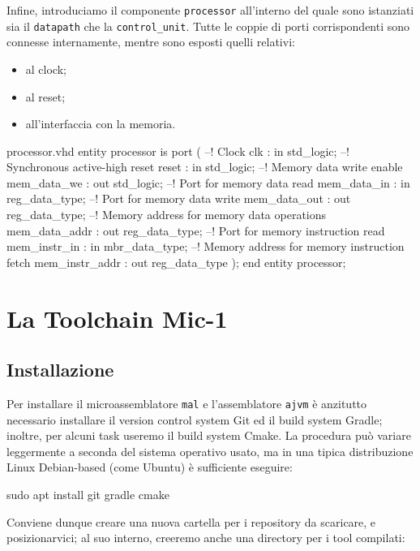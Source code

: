 \documentclass[a4paper,12pt]{scrreprt}
\begin{document}
Infine, introduciamo il componente \lstinline{processor} all'interno del quale
sono istanziati sia il \lstinline{datapath} che la \lstinline{control_unit}.
Tutte le coppie di porti corrispondenti sono connesse internamente, mentre sono
esposti quelli relativi:
\begin{itemize}
  \item al clock;
  \item al reset;
  \item all'interfaccia con la memoria.
\end{itemize}

\begin{myvhdl}{processor.vhd}
entity processor is
  port (
    --! Clock
    clk            : in  std_logic;
    --! Synchronous active-high reset
    reset          : in  std_logic;
    --! Memory data write enable
    mem_data_we    : out std_logic;
    --! Port for memory data read
    mem_data_in    : in  reg_data_type;
    --! Port for memory data write
    mem_data_out   : out reg_data_type;
    --! Memory address for memory data operations
    mem_data_addr  : out reg_data_type;
    --! Port for memory instruction read
    mem_instr_in   : in  mbr_data_type;
    --! Memory address for memory instruction fetch
    mem_instr_addr : out reg_data_type
    );
end entity processor;
\end{myvhdl}

\chapter{La Toolchain Mic-1}

\section{Installazione}

Per installare il microassemblatore \lstinline{mal} e l'assemblatore
\lstinline{ajvm} è anzitutto necessario installare il version control system Git
ed il build system Gradle; inoltre, per alcuni task useremo il build system
Cmake. La procedura può variare leggermente a seconda del sistema operativo
usato, ma in una tipica distribuzione Linux Debian-based (come Ubuntu) è
sufficiente eseguire:

\begin{commandshell}
  sudo apt install git gradle cmake
\end{commandshell}

Conviene dunque creare una nuova cartella per i repository da scaricare, e
posizionarvici; al suo interno, creeremo anche una directory per i tool compilati:
\end{document}
